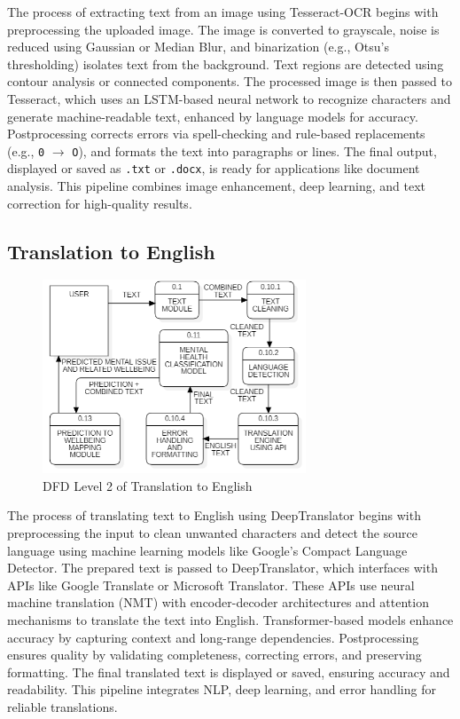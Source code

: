 \noindent
The process of extracting text from an image using Tesseract-OCR begins with preprocessing the uploaded image. The image is converted to grayscale, noise is reduced using Gaussian or Median Blur, and binarization (e.g., Otsu’s thresholding) isolates text from the background. Text regions are detected using contour analysis or connected components. The processed image is then passed to Tesseract, which uses an LSTM-based neural network to recognize characters and generate machine-readable text, enhanced by language models for accuracy. Postprocessing corrects errors via spell-checking and rule-based replacements (e.g., \texttt{0} $\rightarrow$ \texttt{O}), and formats the text into paragraphs or lines. The final output, displayed or saved as \texttt{.txt} or \texttt{.docx}, is ready for applications like document analysis. This pipeline combines image enhancement, deep learning, and text correction for high-quality results.

\subsection{Translation to English}

\begin{figure}[h!]  
    \centering
    \includegraphics[width=0.7\textwidth]{Images/DFD L2 TE.png}  
    \caption{DFD Level 2 of Translation to English}
    \label{dfdl111}  %
\end{figure}

\noindent
The process of translating text to English using DeepTranslator begins with preprocessing the input to clean unwanted characters and detect the source language using machine learning models like Google’s Compact Language Detector. The prepared text is passed to DeepTranslator, which interfaces with APIs like Google Translate or Microsoft Translator. These APIs use neural machine translation (NMT) with encoder-decoder architectures and attention mechanisms to translate the text into English. Transformer-based models enhance accuracy by capturing context and long-range dependencies. Postprocessing ensures quality by validating completeness, correcting errors, and preserving formatting. The final translated text is displayed or saved, ensuring accuracy and readability. This pipeline integrates NLP, deep learning, and error handling for reliable translations.

